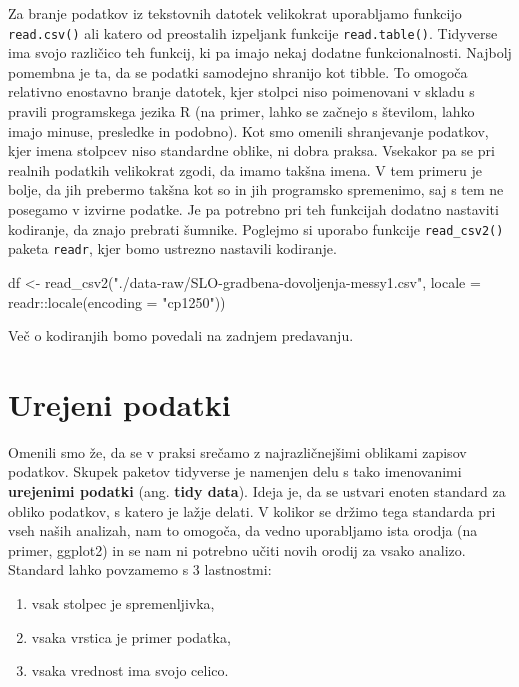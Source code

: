 \documentclass[
]{book}
\newenvironment{Shaded}{\begin{snugshade}}{\end{snugshade}}
\newcommand{\AttributeTok}[1]{\textcolor[rgb]{0.77,0.63,0.00}{#1}}
\newcommand{\FunctionTok}[1]{\textcolor[rgb]{0.00,0.00,0.00}{#1}}
\newcommand{\NormalTok}[1]{#1}
\newcommand{\OtherTok}[1]{\textcolor[rgb]{0.56,0.35,0.01}{#1}}
\newcommand{\SpecialCharTok}[1]{\textcolor[rgb]{0.00,0.00,0.00}{#1}}
\newcommand{\StringTok}[1]{\textcolor[rgb]{0.31,0.60,0.02}{#1}}
\providecommand{\tightlist}{%
  \setlength{\itemsep}{0pt}\setlength{\parskip}{0pt}}
\begin{document}
Za branje podatkov iz tekstovnih datotek velikokrat uporabljamo funkcijo \texttt{read.csv()} ali katero od preostalih izpeljank funkcije \texttt{read.table()}. Tidyverse ima svojo različico teh funkcij, ki pa imajo nekaj dodatne funkcionalnosti. Najbolj pomembna je ta, da se podatki samodejno shranijo kot tibble. To omogoča relativno enostavno branje datotek, kjer stolpci niso poimenovani v skladu s pravili programskega jezika R (na primer, lahko se začnejo s številom, lahko imajo minuse, presledke in podobno). Kot smo omenili shranjevanje podatkov, kjer imena stolpcev niso standardne oblike, ni dobra praksa. Vsekakor pa se pri realnih podatkih velikokrat zgodi, da imamo takšna imena. V tem primeru je bolje, da jih prebermo takšna kot so in jih programsko spremenimo, saj s tem ne posegamo v izvirne podatke. Je pa potrebno pri teh funkcijah dodatno nastaviti kodiranje, da znajo prebrati šumnike. Poglejmo si uporabo funkcije \texttt{read\_csv2()} paketa \texttt{readr}, kjer bomo ustrezno nastavili kodiranje.

\begin{Shaded}
\begin{Highlighting}[]
\NormalTok{df }\OtherTok{\textless{}{-}} \FunctionTok{read\_csv2}\NormalTok{(}\StringTok{"./data{-}raw/SLO{-}gradbena{-}dovoljenja{-}messy1.csv"}\NormalTok{,}
                \AttributeTok{locale =}\NormalTok{ readr}\SpecialCharTok{::}\FunctionTok{locale}\NormalTok{(}\AttributeTok{encoding =} \StringTok{"cp1250"}\NormalTok{))}
\end{Highlighting}
\end{Shaded}

Več o kodiranjih bomo povedali na zadnjem predavanju.

\hypertarget{urejeni-podatki}{%
\section{Urejeni podatki}\label{urejeni-podatki}}

Omenili smo že, da se v praksi srečamo z najrazličnejšimi oblikami zapisov podatkov. Skupek paketov tidyverse je namenjen delu s tako imenovanimi \textbf{urejenimi podatki} (ang. \textbf{tidy data}). Ideja je, da se ustvari enoten standard za obliko podatkov, s katero je lažje delati. V kolikor se držimo tega standarda pri vseh naših analizah, nam to omogoča, da vedno uporabljamo ista orodja (na primer, ggplot2) in se nam ni potrebno učiti novih orodij za vsako analizo. Standard lahko povzamemo s 3 lastnostmi:

\begin{enumerate}
\def\labelenumi{\arabic{enumi})}
\tightlist
\item
  vsak stolpec je spremenljivka,
\item
  vsaka vrstica je primer podatka,
\item
  vsaka vrednost ima svojo celico.
\end{enumerate}
\end{document}

